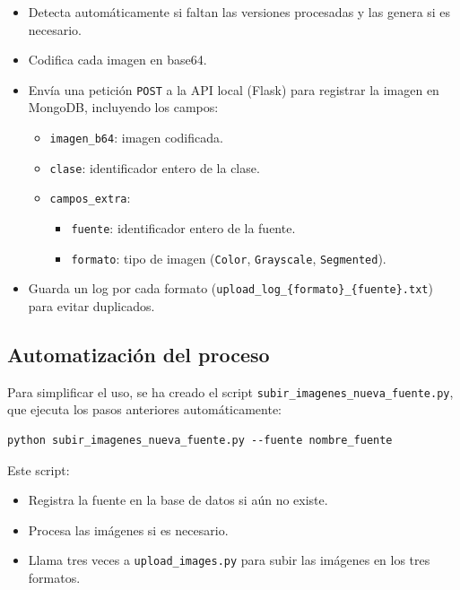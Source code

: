 \documentclass[12pt,a4paper]{article}
\begin{document}
\begin{itemize}
    \item Detecta automáticamente si faltan las versiones procesadas y las genera si es necesario.
    \item Codifica cada imagen en base64.
    \item Envía una petición \texttt{POST} a la API local (Flask) para registrar la imagen en MongoDB, incluyendo los campos:
    \begin{itemize}
        \item \texttt{imagen\_b64}: imagen codificada.
        \item \texttt{clase}: identificador entero de la clase.
        \item \texttt{campos\_extra}:
        \begin{itemize}
            \item \texttt{fuente}: identificador entero de la fuente.
            \item \texttt{formato}: tipo de imagen (\texttt{Color}, \texttt{Grayscale}, \texttt{Segmented}).
        \end{itemize}
    \end{itemize}
    \item Guarda un log por cada formato (\texttt{upload\_log\_\{formato\}\_\{fuente\}.txt}) para evitar duplicados.
\end{itemize}

\subsection{Automatización del proceso}

Para simplificar el uso, se ha creado el script \texttt{subir\_imagenes\_nueva\_fuente.py}, que ejecuta los pasos anteriores automáticamente:

\begin{verbatim}
python subir_imagenes_nueva_fuente.py --fuente nombre_fuente
\end{verbatim}

Este script:

\begin{itemize}
    \item Registra la fuente en la base de datos si aún no existe.
    \item Procesa las imágenes si es necesario.
    \item Llama tres veces a \texttt{upload\_images.py} para subir las imágenes en los tres formatos.
\end{itemize}
\end{document}
